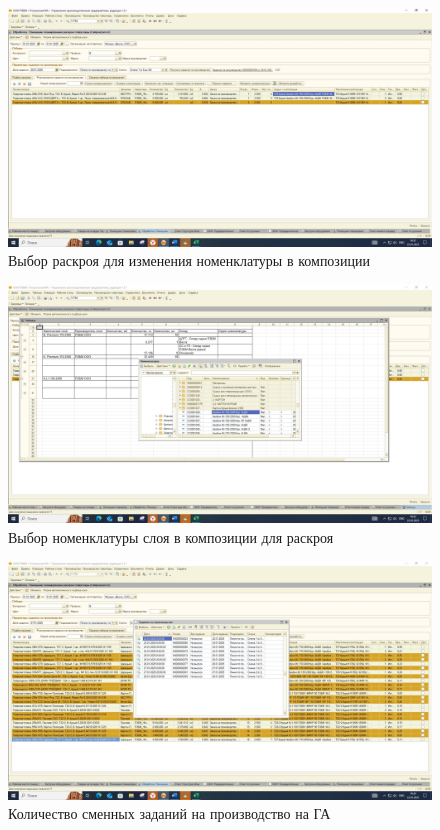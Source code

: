 \begin{figure}
\begin{center}
 \includegraphics[height=0.35\textheight, keepaspectratio]{Pics/ПЛ9.jpg}
\end{center}
 \caption{Выбор раскроя для изменения номенклатуры в композиции}
 \label{pic:ПЛ9}
\end{figure}


\begin{figure}
\begin{center}
 \includegraphics[height=0.35\textheight, keepaspectratio]{Pics/ПЛ10.jpg}
\end{center}
 \caption{Выбор номенклатуры слоя в композиции для раскроя}
 \label{pic:ПЛ10}
\end{figure}


\begin{figure}
\begin{center}
 \includegraphics[height=0.35\textheight, keepaspectratio]{Pics/ПЛ11.jpg}
\end{center}
 \caption{Количество сменных заданий на производство на ГА}
 \label{pic:ПЛ11}
\end{figure}


